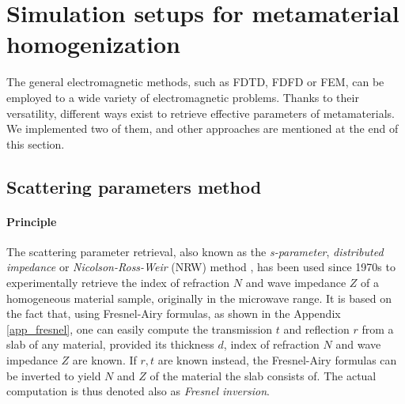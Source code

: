 

\section{Simulation setups for metamaterial homogenization} %
The general electromagnetic methods, such as FDTD, FDFD or FEM, can be employed to a wide variety of electromagnetic problems. Thanks to their versatility, different ways exist to retrieve effective parameters of metamaterials. We implemented two of them, and other approaches are mentioned at the end of this section.
\subsection{Scattering parameters method}
\label{chapter_sparam}
\paragraph{Principle} %
The scattering parameter retrieval, also known as the \textit{s-parameter}, \textit{distributed impedance} or \textit{Nicolson-Ross-Weir} (NRW) method \cite{nicolson1970measurement, weir1974automatic}, has been used since 1970s to experimentally retrieve the index of refraction $N$ and wave impedance $Z$ of a homogeneous material sample, originally in the microwave range. It is based on the fact that, using Fresnel-Airy formulas, as shown in the Appendix \ref{app_fresnel},
one can easily compute the transmission $t$ and reflection $r$ from a slab of any material, provided its thickness $d$, index of refraction $N$ and wave impedance $Z$ are known.  If $r,t$ are known instead, the Fresnel-Airy formulas can be inverted to yield $N$ and $Z$ of the material the slab consists of. The actual computation is thus denoted also as \textit{Fresnel inversion}.

